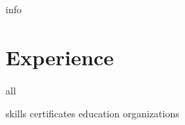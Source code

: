 \documentclass[letterpaper,11pt]{article}
\begin{document}
{info}

\section{Experience}
  {all}

{skills}
{certificates}
{education}
{organizations}
\end{document}
